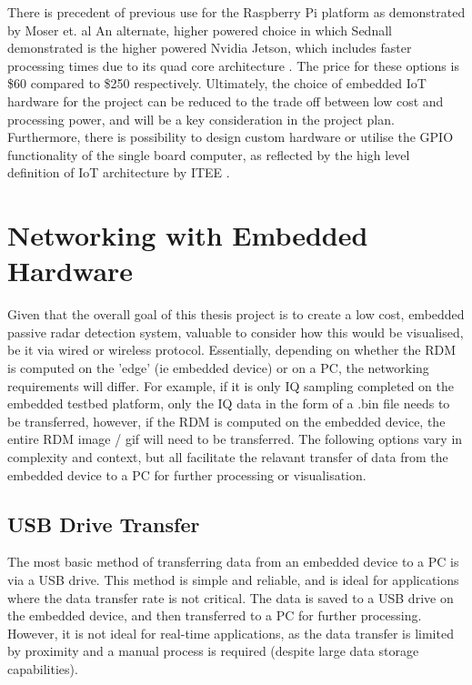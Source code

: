 \par \vspace{0.5cm} 
\noindent There is precedent of previous use for the Raspberry Pi platform as demonstrated by Moser et. al \cite{IOTpassiveRadar} An alternate, higher powered choice in which Sednall demonstrated is the higher powered Nvidia Jetson, which includes faster processing times due to its quad core architecture \cite{FMlowCost}. The price for these options is \$60 compared to \$250 respectively. Ultimately, the choice of embedded IoT hardware for the project can be reduced to the trade off between low cost and processing power, and will be a key consideration in the project plan. Furthermore, there is possibility to design custom hardware or utilise the GPIO functionality of the single board computer, as reflected by the high level definition of IoT architecture by ITEE \cite{IoTdefinition}.

\section{Networking with Embedded Hardware}

Given that the overall goal of this thesis project is to create a low cost, embedded passive radar detection system, valuable to consider how this would be visualised, be it via wired or wireless protocol. Essentially, depending on whether the RDM is computed on the 'edge' (ie embedded device) or on a PC, the networking requirements will differ. For example, if it is only IQ sampling completed on the embedded testbed platform, only the IQ data in the form of a .bin file needs to be transferred, however, if the RDM is computed on the embedded device, the entire RDM image / gif will need to be transferred. The following options vary in complexity and context, but all facilitate the relavant transfer of data from the embedded device to a PC for further processing or visualisation.

\subsection{USB Drive Transfer}
The most basic method of transferring data from an embedded device to a PC is via a USB drive. This method is simple and reliable, and is ideal for applications where the data transfer rate is not critical. The data is saved to a USB drive on the embedded device, and then transferred to a PC for further processing. However, it is not ideal for real-time applications, as the data transfer is limited by proximity and a manual process is required (despite large data storage capabilities).

